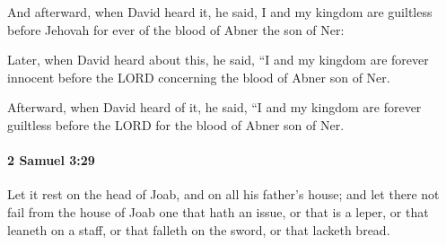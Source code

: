 			\begin{versebox}
					\item[BHS] 
					\item[ASV] And afterward, when David heard it, he said, I and my kingdom are guiltless before Jehovah for ever of the blood of Abner the son of Ner:
					\item[NIV] Later, when David heard about this, he said, “I and my kingdom are forever innocent before the LORD concerning the blood of Abner son of Ner.
					\item[NRSV] Afterward, when David heard of it, he said, “I and my kingdom are forever guiltless before the LORD for the blood of Abner son of Ner.
			\end{versebox}

		\paragraph{2 Samuel 3:29} %
			\label{2SAMUEL-3-29}

			Let it rest on the head of Joab, and on all his father’s house; and let there not fail from the house of Joab one that hath an issue, or that is a leper, or that leaneth on a staff, or that falleth on the sword, or that lacketh bread.

